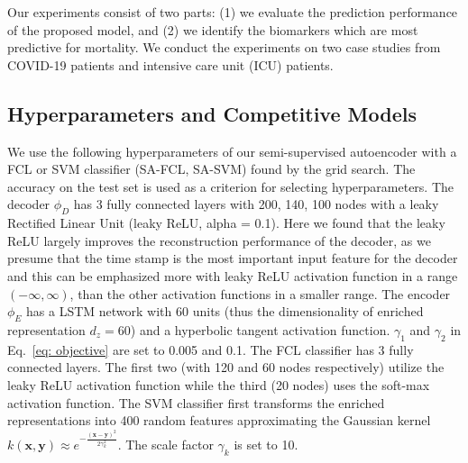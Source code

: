 Our experiments consist of two parts: (1) we evaluate the prediction performance of the proposed model, and (2) we identify the biomarkers which are most predictive for mortality. We conduct the experiments on two case studies from COVID-19 patients and intensive care unit (ICU) patients.

\subsection{Hyperparameters and Competitive Models}
We use the following hyperparameters of our semi-supervised autoencoder with a FCL or SVM classifier (SA-FCL, SA-SVM) found by the grid search. The accuracy on the test set is used as a criterion for selecting hyperparameters. The decoder $\phi_D$ has 3 fully connected layers with 200, 140, 100 nodes with a leaky Rectified Linear Unit (leaky ReLU, alpha = 0.1). Here we found that the leaky ReLU largely improves the reconstruction performance of the decoder, as we presume that the time stamp is the most important input feature for the decoder and this can be emphasized more with leaky ReLU activation function in a range $(- \infty, \infty)$, than the other activation functions in a smaller range. The encoder $\phi_E$ has a LSTM network with 60 units (thus the dimensionality of enriched representation $d_z = 60$) and a hyperbolic tangent activation function. $\gamma_1$ and $\gamma_2$ in Eq.~\eqref{eq: objective} are set to 0.005 and 0.1. The FCL classifier has 3 fully connected layers. The first two (with 120 and 60 nodes respectively) utilize the leaky ReLU activation function while the third (20 nodes) uses the soft-max activation function. The SVM classifier first transforms the enriched representations into 400 random features approximating the Gaussian kernel $k(\mathbf{x}, \mathbf{y}) \approx e^{-\frac{(\mathbf{x} - \mathbf{y})^2}{2\gamma_k^2}}$. The scale factor $\gamma_k$ is set to 10.


